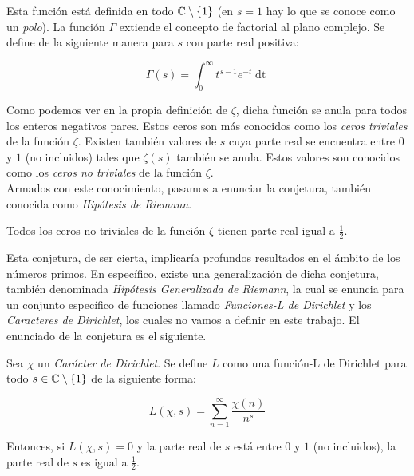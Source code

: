 Esta función está definida en todo $\mathbb{C} \setminus \{1\}$ (en $s = 1$ hay lo que se conoce como un \textit{polo}). La función $\Gamma$ extiende el concepto de factorial al plano complejo. Se define de la siguiente manera para $s$ con parte real positiva:

\begin{equation}
\Gamma(s) = \int_{0}^{\infty}t^{s-1}e^{-t}\mathop{dt}
\end{equation}

Como podemos ver en la propia definición de $\zeta$, dicha función se anula para todos los enteros negativos pares. Estos ceros son más conocidos como los \textit{ceros triviales} de la función $\zeta$. Existen también valores de $s$ cuya parte real se encuentra entre $0$ y $1$ (no incluidos) tales que $\zeta(s)$ también se anula. Estos valores son conocidos como los \textit{ceros no triviales} de la función $\zeta$.\\

Armados con este conocimiento, pasamos a enunciar la conjetura, también conocida como \textit{Hipótesis de Riemann}.

\begin{conjetura}\label{hipotesis_de_riemann}
	Todos los ceros no triviales de la función $\zeta$ tienen parte real igual a $\frac{1}{2}$.
\end{conjetura}

Esta conjetura, de ser cierta, implicaría profundos resultados en el ámbito de los números primos. En específico, existe una generalización de dicha conjetura, también denominada \textit{Hipótesis Generalizada de Riemann}, la cual se enuncia para un conjunto específico de funciones llamado \textit{Funciones-L de Dirichlet} y los \textit{Caracteres de Dirichlet}, los cuales no vamos a definir en este trabajo. El enunciado de la conjetura es el siguiente.

\begin{conjetura}\label{hipotesis_generalizada_de_riemann}
	Sea $\chi$ un \textit{Carácter de Dirichlet}. Se define $L$ como una función-L de Dirichlet para todo $s \in \mathbb{C} \setminus \{1\}$ de la siguiente forma:
	
	\begin{equation}
	L(\chi, s) = \sum_{n=1}^{\infty}\frac{\chi(n)}{n^s}
	\end{equation}
	
	Entonces, si $L(\chi, s) = 0$ y la parte real de $s$ está entre $0$ y $1$ (no incluidos), la parte real de $s$ es igual a $\frac{1}{2}$.
\end{conjetura}

